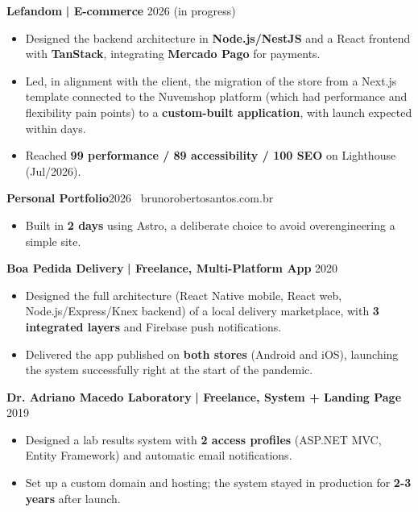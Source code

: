 \documentclass[a4paper]{article}
\begin{document}
    \textbf{Lefandom}\textbf{ | E-commerce} \hfill  2026 (in progress)\\
    \vspace{-3mm}
    \begin{itemize} \itemsep -3pt
        \item Designed the backend architecture in \textbf{Node.js/NestJS} and a React frontend with \textbf{TanStack}, integrating \textbf{Mercado Pago} for payments.
        \item Led, in alignment with the client, the migration of the store from a Next.js template connected to the Nuvemshop platform (which had performance and flexibility pain points) to a \textbf{custom-built application}, with launch expected within days.
        \item Reached \textbf{99 performance / 89 accessibility / 100 SEO} on Lighthouse (Jul/2026).
    \end{itemize}

    \textbf{Personal Portfolio}\hfill  2026 \textbullet\ brunorobertosantos.com.br\\
    \vspace{-3mm}
    \begin{itemize} \itemsep -3pt
        \item Built in \textbf{2 days} using Astro, a deliberate choice to avoid overengineering a simple site.
    \end{itemize}

    \textbf{Boa Pedida Delivery}\textbf{ | Freelance, Multi-Platform App} \hfill  2020\\
    \vspace{-3mm}
    \begin{itemize} \itemsep -3pt
        \item Designed the full architecture (React Native mobile, React web, Node.js/Express/Knex backend) of a local delivery marketplace, with \textbf{3 integrated layers} and Firebase push notifications.
        \item Delivered the app published on \textbf{both stores} (Android and iOS), launching the system successfully right at the start of the pandemic.
    \end{itemize}

    \textbf{Dr. Adriano Macedo Laboratory}\textbf{ | Freelance, System + Landing Page} \hfill  2019\\
    \vspace{-3mm}
    \begin{itemize} \itemsep -3pt
        \item Designed a lab results system with \textbf{2 access profiles} (ASP.NET MVC, Entity Framework) and automatic email notifications.
        \item Set up a custom domain and hosting; the system stayed in production for \textbf{2-3 years} after launch.
    \end{itemize}
\end{document}
